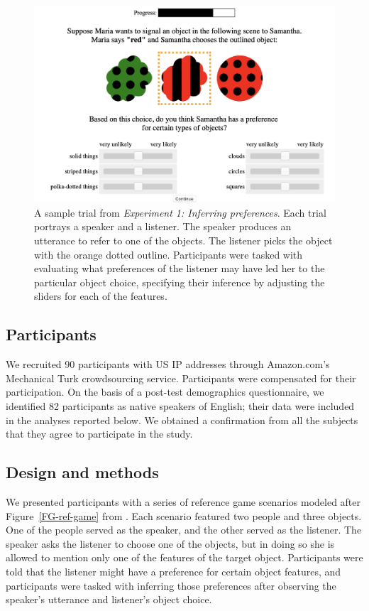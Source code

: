 \documentclass[11pt,a4paper]{article}
\begin{document}
\begin{figure}[ht!]
	\centering
	\includegraphics[width=4.5in]{images/preference-trial.png}
	\caption{ \small{A sample trial from \emph{Experiment 1: Inferring preferences}. Each trial portrays a speaker and a listener. The speaker produces an utterance to refer to one of the objects. The listener picks the object with the orange dotted outline. Participants were tasked with evaluating what preferences of the listener may have led her to the particular object choice, specifying their inference by adjusting the sliders for each of the features}.}
	\label{exp1-trial}
\end{figure}

\subsection{Participants}

We recruited 90 participants with US IP addresses through Amazon.com's Mechanical Turk crowdsourcing service. Participants were compensated for their participation. On the basis of a post-test demographics questionnaire, we identified 82 participants as native speakers of English; their data were included in the analyses reported below. We obtained a confirmation from all the subjects that they agree to participate in the study.

\subsection{Design and methods}

We presented participants with a series of reference game scenarios modeled after Figure~\ref{FG-ref-game} from .
Each scenario featured two people and three objects.
One of the people served as the speaker, and the other served as the listener. The speaker asks the listener to choose one of the objects, but in doing so she is allowed to mention only one of the features of the target object. Participants were told that the listener might have a preference for certain object features, and participants were tasked with inferring those preferences after observing the speaker's utterance and listener's object choice.
\end{document}
